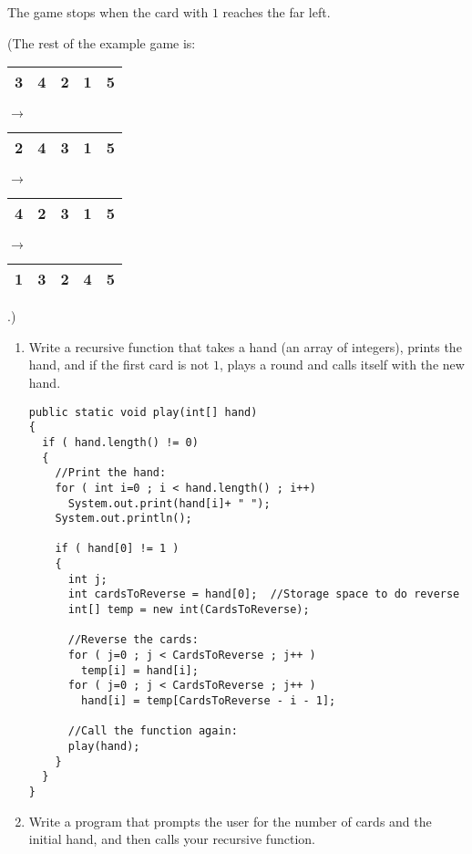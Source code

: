\begin{enumerate}
	   The game stops when the card with $1$ reaches the far
           left.

           (The rest of the example game is:\\
	   \begin{tabular}{|c|c|c|c|c|}
               \hline
               3&4&2&1&5\\
               \hline
           \end{tabular}
	$\rightarrow$
	   \begin{tabular}{|c|c|c|c|c|}
               \hline
               2&4&3&1&5\\
               \hline
           \end{tabular}
	$\rightarrow$
	   \begin{tabular}{|c|c|c|c|c|}
               \hline
               4&2&3&1&5\\
               \hline
           \end{tabular}
	$\rightarrow$
	   \begin{tabular}{|c|c|c|c|c|}
               \hline
               1&3&2&4&5\\
               \hline
           \end{tabular}.)


      \begin{enumerate}
         \item
	   Write a recursive function that takes a hand 
           (an array of integers),
           prints the hand, and if the first card is not $1$, 
           plays a round and calls itself with the new hand.
\begin{verbatim}
public static void play(int[] hand)
{
  if ( hand.length() != 0)
  {
    //Print the hand:
    for ( int i=0 ; i < hand.length() ; i++)
      System.out.print(hand[i]+ " ");
    System.out.println();
    
    if ( hand[0] != 1 )
    {
      int j;
      int cardsToReverse = hand[0];  //Storage space to do reverse
      int[] temp = new int(CardsToReverse);
      
      //Reverse the cards:
      for ( j=0 ; j < CardsToReverse ; j++ )
        temp[i] = hand[i];
      for ( j=0 ; j < CardsToReverse ; j++ )
        hand[i] = temp[CardsToReverse - i - 1];
      
      //Call the function again:
      play(hand);      
    }
  }
}
\end{verbatim}

         \item  Write a program that prompts the user for the number
           of cards and the initial hand, and then calls your
           recursive function.


\end{enumerate}
\end{enumerate}
